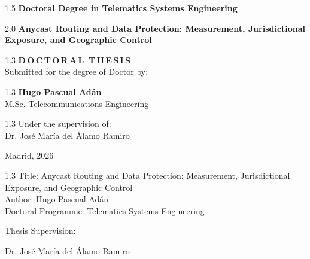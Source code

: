 \documentclass[
A4paper,                %
twoside,                %
openright,              %
chapterprefix=true,     %
12pt,                   %
headings=normal,        %
titlepage=on            %
]{book}
\def\PHDprogramme{Telematics Systems Engineering}
\def\author{Hugo Pascual Ad\'an}
\def\authorStudies{M.Sc. Telecommunications Engineering}
\def\thesisTitle{Anycast Routing and Data Protection: Measurement, Jurisdictional Exposure, and Geographic Control}
\def\thesisPlace{Madrid}
\def\thesisYear{2026}
\def\supervisor{Dr. Jos\'e Mar\'ia del \'Alamo Ramiro}
\begin{document}
\vspace{15 mm}

\begin{center}
\begin{spacing}{1.5}
\textbf{\large {Doctoral Degree in {\PHDprogramme}}}\\
\end{spacing}
\vspace{10 mm}

\begin{spacing}{2.0}
\textbf{\LARGE {\thesisTitle}}
\end{spacing}

\vspace{15 mm}

\begin{spacing}{1.3}
\textbf{\LARGE {D\,O\,C\,T\,O\,R\,A\,L\, T\,H\,E\,S\,I\,S}}\\
\medskip
{\large {Submitted for the degree of Doctor by:}}
\end{spacing}
\end{center}


\begin{center}
\begin{spacing}{1.3}
\textbf{\Large {\author}}\\
{\large {\authorStudies}}\\
\end{spacing}
\end{center}

\vspace{5 mm}
\begin{center}
\begin{spacing}{1.3}
{Under the supervision of:}\\
    {\large {\supervisor}}\\
\end{spacing}
\end{center}

\vspace{15 mm}
\begin{center}
    \large {\thesisPlace, \thesisYear}
\end{center}

\newpage

\pagestyle{plain}				    %

\begin{spacing}{1.3}
Title: \thesisTitle \\
Author: \author \\
Doctoral Programme:	\PHDprogramme
\end{spacing}
Thesis Supervision: 
\begin{mydescription}
    \item \supervisor
\end{mydescription}
\end{document}
